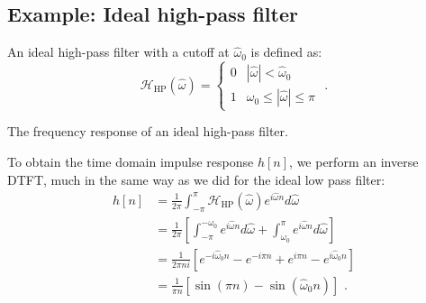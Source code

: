 \subsection{Example: Ideal high-pass filter}

An ideal high-pass filter with a cutoff at $\hat{\omega}_0$ is defined as:
\begin{equation}
  \mathcal{H}_{\mathrm{HP}}(\hat{\omega}) = \left\{ \begin{array}{cc}
    0 & |\hat{\omega}| < \hat{\omega}_0     \\
    1 & \omega_0 \le |\hat{\omega}| \le \pi
  \end{array}\right.\,\,.
\end{equation}
\begin{marginfigure}
  \begin{center}
  \end{center}
  \caption{The frequency response of an ideal high-pass filter.}
\end{marginfigure}
To obtain the time domain impulse response $h[n]$, we perform an
inverse DTFT, much in the same way as we did for the ideal low pass
filter:
\begin{align}
  h[n] & = \frac{1}{2\pi}\int_{-\pi}^{\pi} \mathcal{H}_{\mathrm{HP}}(\hat{\omega}) e^{i\hat{\omega}n} d\hat{\omega}                                     \\
       & =\frac{1}{2\pi}\left[\int_{-\pi}^{-\omega_0} e^{i\hat{\omega}n} d\hat{\omega} + \int_{\omega_0}^{\pi} e^{i\hat{\omega}n} d\hat{\omega} \right] \\
       & =\frac{1}{2\pi ni}\left[ e^{-i\hat{\omega}_0 n} - e^{-i\pi n} + e^{i\pi n} - e^{i\hat{\omega}_0 n} \right]                                     \\
       & =\frac{1}{\pi n}\left[\sin(\pi n) - \sin(\hat{\omega}_0  n) \right]\,\,.
\end{align}
